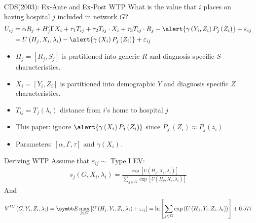 \documentclass[aspectratio=169,10pt]{beamer}
\begin{document}
\begin{frame}{CDS(2003): Ex-Ante and Ex-Post WTP}
What is the value that $i$ places on having hospital $j$ included in network $G$?
\begin{align*}
U_{i j} &=\alpha R_{j}+H_{j}^{\prime} \Gamma X_{i}+\tau_{1} T_{i j}+\tau_{2} T_{i j} \cdot X_{i}+\tau_{3} T_{i j} \cdot R_{j}-\alert{\gamma\left(Y_{i}, Z_{i}\right) P_{j}\left(Z_{i}\right)}+\varepsilon_{i j} \\ &=U\left(H_{j}, X_{i}, \lambda_{i}\right)-\alert{\gamma\left(X_{i}\right) P_{j}\left(Z_{i}\right)}+\varepsilon_{i j} 
\end{align*}

\begin{itemize}
\item $H_{j}=\left[R_{j}, S_{j}\right]$ is partitioned into generic $R$ and diagnosis specific $S$ characteristics.
\item $X_{i}=\left[Y_{i}, Z_{i}\right]$ is partitioned into demographic $Y$ and diagnosis specific $Z$ characteristics.
\item $T_{i j}=T_{j}\left(\lambda_{i}\right)$ distance from $i$'s home to hospital $j$
\item This paper: ignore $\alert{\gamma\left(X_{i}\right) P_{j}\left(Z_{i}\right)}$ since $P_{j'}(Z_i) \approx P_j(z_i)$
\item Parameters: $[\alpha,\Gamma, \tau]$ and $\gamma(X_i)$.
\end{itemize}
\end{frame} 


\begin{frame}{Deriving WTP}
Assume that $\varepsilon_{ij} \sim$ Type I EV:
\begin{align*}
s_{j}\left(G, X_{i}, \lambda_{i}\right)=\frac{\exp \left[U\left(H_{j}, X_{i}, \lambda_{i}\right)\right]}{\sum_{g \in G} \exp \left[U\left(H_{g}, X_{i}, \lambda_{i}\right)\right]}
\end{align*}
And
\begin{align*}
V^{I U}\left(G, Y_{i}, Z_{i}, \lambda_{i}\right)=\E \max _{j \in G}\left[U\left(H_{j}, Y_{i}, Z_{i}, \lambda_{i}\right)+\varepsilon_{i j}\right]=\ln \left[\sum_{j \in G} \exp \left(U\left(H_{j}, Y_{i}, Z_{i}, \lambda_{i}\right)\right)\right] + 0.577
\end{align*}
\end{frame}
\end{document}

